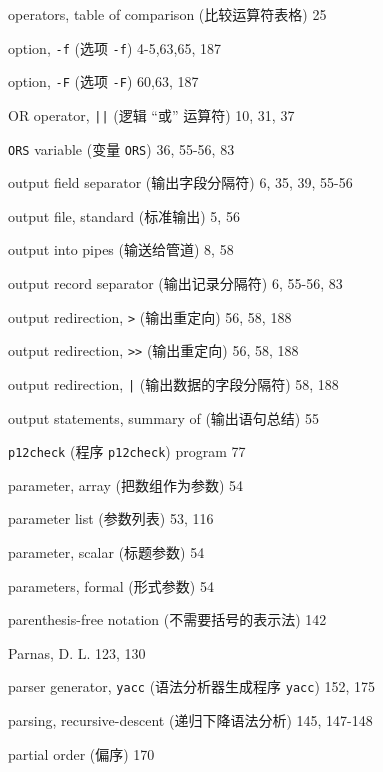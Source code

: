 \begin{multicols}{3}
\hangindent=3pc  operators, table of comparison (比较运算符表格) 25

\hangindent=3pc  option, \verb'-f' (选项 \verb'-f') 4-5,63,65, 187

\hangindent=3pc  option, \verb'-F' (选项 \verb'-F') 60,63, 187

\hangindent=3pc  OR operator, \verb'||' (逻辑 ``或'' 运算符)
10, 31, 37

\hangindent=3pc  \verb'ORS' variable (变量 \verb'ORS') 36, 55-56, 83

\hangindent=3pc  output field separator (输出字段分隔符)
6, 35, 39, 55-56

\hangindent=3pc  output file, standard (标准输出) 5, 56

\hangindent=3pc  output into pipes (输送给管道) 8, 58

\hangindent=3pc  output record separator (输出记录分隔符)
6, 55-56,  83

\hangindent=3pc  output redirection, \verb'>' (输出重定向)
56, 58, 188

\hangindent=3pc  output redirection, \verb'>>' (输出重定向) 56, 58, 188

\hangindent=3pc  output redirection, \verb'|'
(输出数据的字段分隔符) 58, 188

\hangindent=3pc  output statements, summary of (输出语句总结) 55

\hangindent=3pc  \verb'p12check' (程序 \verb'p12check') program 77

\hangindent=3pc  parameter, array (把数组作为参数) 54

\hangindent=3pc  parameter list (参数列表) 53, 116

\hangindent=3pc  parameter, scalar (标题参数) 54

\hangindent=3pc  parameters, formal (形式参数) 54

\hangindent=3pc  parenthesis-free notation (不需要括号的表示法) 142

\hangindent=3pc  Parnas, D. L. 123, 130

\hangindent=3pc  parser generator, \verb'yacc'
(语法分析器生成程序 \verb'yacc') 152, 175

\hangindent=3pc  parsing, recursive-descent (递归下降语法分析)
145, 147-148

\hangindent=3pc  partial order (偏序) 170


\end{multicols}
